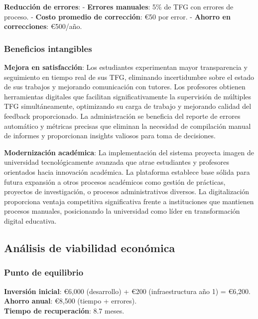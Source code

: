 \documentclass[12pt,a4paper,oneside]{report}
\begin{document}
\textbf{Reducción de errores}: - \textbf{Errores manuales}: 5\% de TFG
con errores de proceso. - \textbf{Costo promedio de corrección}: €50 por
error. - \textbf{Ahorro en correcciones}: €500/año.

\subsubsection{Beneficios intangibles}\label{beneficios-intangibles}

\textbf{Mejora en satisfacción}: Los estudiantes experimentan mayor transparencia y seguimiento en tiempo real de sus TFG, eliminando incertidumbre sobre el estado de sus trabajos y mejorando comunicación con tutores. Los profesores obtienen herramientas digitales que facilitan significativamente la supervisión de múltiples TFG simultáneamente, optimizando su carga de trabajo y mejorando calidad del feedback proporcionado. La administración se beneficia del reporte de errores automático y métricas precisas que eliminan la necesidad de compilación manual de informes y proporcionan insights valiosos para toma de decisiones.

\textbf{Modernización académica}: La implementación del sistema proyecta imagen de universidad tecnológicamente avanzada que atrae estudiantes y profesores orientados hacia innovación académica. La plataforma establece base sólida para futura expansión a otros procesos académicos como gestión de prácticas, proyectos de investigación, o procesos administrativos diversos. La digitalización proporciona ventaja competitiva significativa frente a instituciones que mantienen procesos manuales, posicionando la universidad como líder en transformación digital educativa.

\subsection{Análisis de viabilidad
económica}\label{anuxe1lisis-de-viabilidad-econuxf3mica}

\subsubsection{Punto de equilibrio}\label{punto-de-equilibrio}

\textbf{Inversión inicial}: €6,000 (desarrollo) + €200 (infraestructura
año 1) = €6,200.\\
\textbf{Ahorro anual}: €8,500 (tiempo + errores).\\
\textbf{Tiempo de recuperación}: 8.7 meses.
\end{document}
